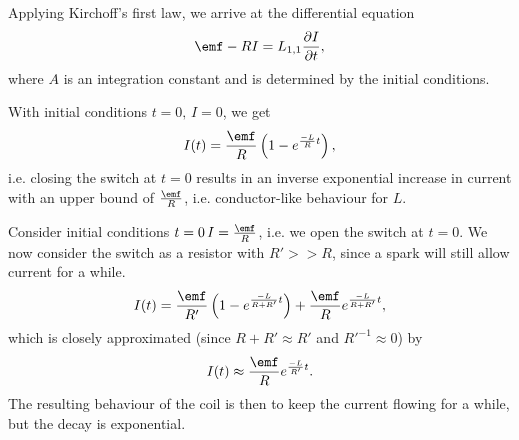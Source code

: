 \documentclass[a4paper, 12pt]{article}
\begin{document}
            Applying Kirchoff's first law, we arrive at the differential equation
            \begin{equation}
                \emf - RI = L_{1,1}\frac{\partial I}{\partial t},
            \end{equation}
            where $A$ is an integration constant and is determined by the initial conditions.

            With initial conditions $t=0,\, I=0$, we get 
            \begin{equation}
                I(t) = \frac{\emf}{R}\left(1-e^{\frac{-L}{R}t}\right),
            \end{equation}
            i.e. closing the switch at $t=0$ results in an inverse exponential increase in current 
            with an upper bound of $\frac{\emf}{R}$, i.e. conductor-like behaviour for $L$.

            Consider initial conditions $t=0\, I = \frac{\emf}{R}$, i.e. we open the switch at $t=0$.
            We now consider the switch as a resistor with $R' >> R$, since a spark will still allow current for a while.
            \begin{equation}
                I(t) = \frac{\emf}{R'}\left(1-e^{\frac{-L}{R+R'}t}\right) + \frac{\emf}{R} e^{\frac{-L}{R+R'}t},
            \end{equation}
            which is closely approximated (since $R+R' \approx R'$ and $R'^{-1} \approx 0$) by
            \begin{equation}
                I(t) \approx \frac{\emf}{R}e^{\frac{-L}{R'}t}.
            \end{equation}
            The resulting behaviour of the coil is then to keep the current flowing for a while, but the decay is exponential.
\end{document}
